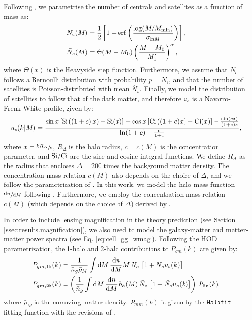 \documentclass[a4paper,11pt]{article}
\begin{document}
    Following \cite{2011ApJ...736...59Z}, we parametrise the number of centrals and satellites as a function of mass as:
    \begin{align}
      &\bar{N}_c(M)=\frac{1}{2}\left[1+{\rm erf}\left(\frac{\log(M/M_{\rm min})}{\sigma_{{\rm ln}M}}\right)\right],\\
      &\bar{N}_s(M)=\Theta(M-M_0)\left(\frac{M-M_0}{M_1'}\right)^\alpha,
    \end{align}
    where $\Theta(x)$ is the Heavyside step function. Furthermore, we assume that $N_c$ follows a Bernoulli distribution with probability $p=\bar{N}_c$, and that the number of satellites is Poisson-distributed with mean $\bar{N}_s$. Finally, we model the distribution of satellites to follow that of the dark matter, and therefore $u_s$ is a Navarro-Frenk-White profile, given by:
    \begin{equation}
      u_s(k|M)=\frac{\sin x\left[{\rm Si}\left((1+c)\,x\right)-{\rm Si}(x)\right]+\cos x\left[{\rm Ci}\left((1+c)x\right)-{\rm Ci}(x)\right]-\frac{\sin(cx)}{(1+c)x}}{{\rm ln}(1+c)-\frac{c}{1+c}},
    \end{equation}
    where $x=\sfrac{k R_\Delta}{c}$, $R_\Delta$ is the halo radius, $c=c(M)$ is the concentration parameter, and ${\rm Si}/{\rm Ci}$ are the sine and cosine integral functions. We define $R_\Delta$ as the radius that encloses $\Delta=200$ times the background matter density. The concentration-mass relation $c(M)$ also depends on the choice of $\Delta$, and we follow the parametrization of \cite{Duffy:2008}. In this work, we model the halo mass function $\sfrac{\mathrm{d}n}{\mathrm{d}M}$ following \cite{Tinker:2010}. Furthermore, we employ the concentration-mass relation $c(M)$ (which depends on the choice of $\Delta$) derived by \cite{Duffy:2008}.

    In order to include lensing magnification in the theory prediction (see Section \ref{ssec:results.magnification}), we also need to model the galaxy-matter and matter-matter power spectra (see Eq. \ref{eq:cell_gg_wmag}). Following the HOD parametrization, the 1-halo and 2-halo contributions to $P_{gm}(k)$ are given by:
    \begin{align}
      & P_{gm,{\rm 1h}}(k)=\frac{1}{\bar{n}_g\bar{\rho}_M} \int \mathrm{d}M\,\frac{\mathrm{d}n}{\mathrm{d}M} M\,\bar{N}_c\,\left[1+\bar{N}_su_s(k)\right],\\
      & P_{gm,{\rm 2h}}(k)=\left(\frac{1}{\bar{n}_g} \int \mathrm{d}M\,\frac{\mathrm{d}n}{\mathrm{d}M}\,b_h(M)\,\bar{N}_c\,\left[1+\bar{N}_su_s(k)\right]\right)\,P_{\rm lin}(k),
    \end{align}
    where $\bar{\rho}_M$ is the comoving matter density. $P_{mm}(k)$ is given by the {\tt Halofit} fitting function \cite{Smith:2003} with the revisions of \cite{Takahashi:2012}.
\end{document}
